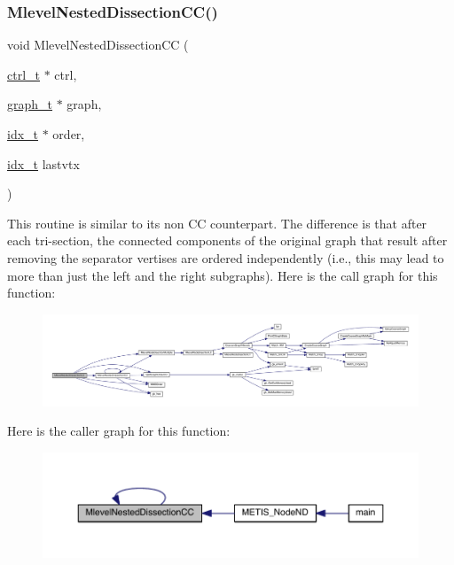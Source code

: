 \subsubsection{\texorpdfstring{Mlevel\+Nested\+Dissection\+C\+C()}{MlevelNestedDissectionCC()}}
{\footnotesize\ttfamily void Mlevel\+Nested\+Dissection\+CC (\begin{DoxyParamCaption}\item[{\hyperlink{a00742}{ctrl\+\_\+t} $\ast$}]{ctrl,  }\item[{\hyperlink{a00734}{graph\+\_\+t} $\ast$}]{graph,  }\item[{\hyperlink{a00876_aaa5262be3e700770163401acb0150f52}{idx\+\_\+t} $\ast$}]{order,  }\item[{\hyperlink{a00876_aaa5262be3e700770163401acb0150f52}{idx\+\_\+t}}]{lastvtx }\end{DoxyParamCaption})}

This routine is similar to its non \textquotesingle{}CC\textquotesingle{} counterpart. The difference is that after each tri-\/section, the connected components of the original graph that result after removing the separator vertises are ordered independently (i.\+e., this may lead to more than just the left and the right subgraphs). Here is the call graph for this function\+:\nopagebreak
\begin{figure}[H]
\begin{center}
\leavevmode
\includegraphics[width=350pt]{a00945_a3ef15d1ffff55a81b8486bee09239073_cgraph}
\end{center}
\end{figure}
Here is the caller graph for this function\+:\nopagebreak
\begin{figure}[H]
\begin{center}
\leavevmode
\includegraphics[width=350pt]{a00945_a3ef15d1ffff55a81b8486bee09239073_icgraph}
\end{center}
\end{figure}
\mbox{\label{a00945_a55cff7f4deda5d27c8736089a878964c}} 
